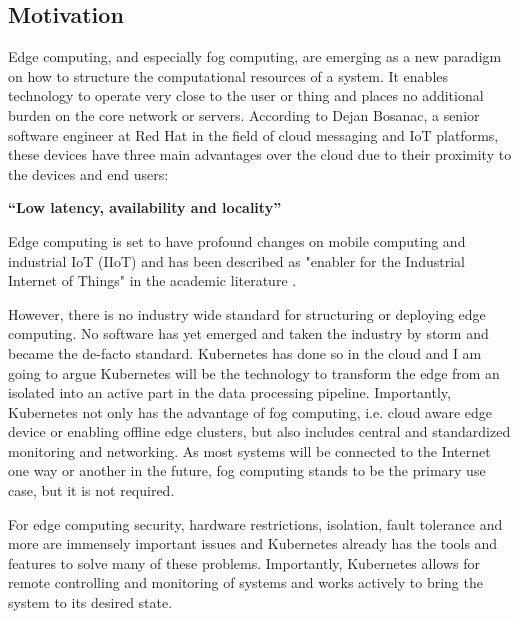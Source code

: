 \subsection{Motivation}
Edge computing, and especially fog computing, are emerging as a new paradigm on how to structure the computational resources of a system. It enables technology to operate very close to the user or thing and places no additional burden on the core network or servers. According to Dejan Bosanac, a senior software engineer at Red Hat in the field of cloud messaging and IoT platforms, these devices have three main advantages over the cloud due to their proximity to the devices and end users: 
\begin{displayquote}
{\textbf{``Low latency, availability and locality''}}\cite{IntroducingDejanBosanac:KubernetesIoTEdgeWorkingGroup}
\end{displayquote} 
Edge computing is set to have profound changes on mobile computing and industrial IoT (IIoT) and has been described as "enabler for the Industrial Internet of Things"\cite{steiner2016fogenablerIIoT} in the academic literature .

However, there is no industry wide standard for structuring or deploying edge computing. No software has yet emerged and taken the industry by storm and became the de-facto standard. Kubernetes has done so in the cloud and I am going to argue Kubernetes will be the technology to transform the edge from an isolated into an active part in the data processing pipeline. Importantly, Kubernetes not only has the advantage of fog computing, i.e. cloud aware edge device or enabling offline edge clusters, but also includes central and standardized monitoring and networking. As most systems will be connected to the Internet one way or another in the future, fog computing stands to be the primary use case, but it is not required.

For edge computing security, hardware restrictions, isolation, fault tolerance and more are immensely important issues and Kubernetes already has the tools and features to solve many of these problems. Importantly, Kubernetes allows for remote controlling and monitoring of systems and works actively to bring the system to its desired state.

